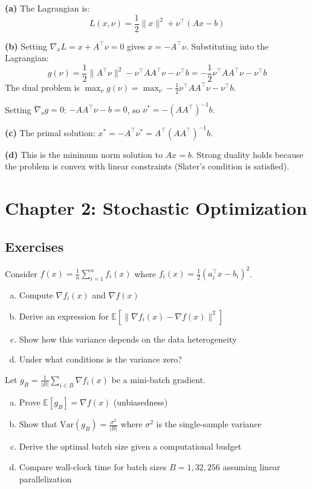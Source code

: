 \documentclass[../main.tex]{subfiles}
\begin{document}
\begin{solution}[Exercise 1.5]
\textbf{(a)} The Lagrangian is:
\[
L(x, \nu) = \frac{1}{2}\|x\|^2 + \nu^\top(Ax - b)
\]

\textbf{(b)} Setting $\nabla_x L = x + A^\top\nu = 0$ gives $x = -A^\top\nu$. Substituting into the Lagrangian:
\[
g(\nu) = \frac{1}{2}\|A^\top\nu\|^2 - \nu^\top A A^\top\nu - \nu^\top b = -\frac{1}{2}\nu^\top AA^\top\nu - \nu^\top b
\]
The dual problem is $\max_\nu g(\nu) = \max_\nu -\frac{1}{2}\nu^\top AA^\top\nu - \nu^\top b$.

Setting $\nabla_\nu g = 0$: $-AA^\top\nu - b = 0$, so $\nu^* = -(AA^\top)^{-1}b$.

\textbf{(c)} The primal solution: $x^* = -A^\top\nu^* = A^\top(AA^\top)^{-1}b$.

\textbf{(d)} This is the minimum norm solution to $Ax = b$. Strong duality holds because the problem is convex with linear constraints (Slater's condition is satisfied).
\end{solution}

\section{Chapter 2: Stochastic Optimization}\label{sec:ex-stochastic}

\subsection{Exercises}

\begin{simpleexercise}
Consider $f(x) = \frac{1}{n}\sum_{i=1}^n f_i(x)$ where $f_i(x) = \frac{1}{2}(a_i^\top x - b_i)^2$.
\begin{enumerate}[(a)]
    \item Compute $\nabla f_i(x)$ and $\nabla f(x)$
    \item Derive an expression for $\mathbb{E}[\|\nabla f_i(x) - \nabla f(x)\|^2]$
    \item Show how this variance depends on the data heterogeneity
    \item Under what conditions is the variance zero?
\end{enumerate}
\end{simpleexercise}

\begin{simpleexercise}
Let $g_B = \frac{1}{|B|}\sum_{i \in B} \nabla f_i(x)$ be a mini-batch gradient.
\begin{enumerate}[(a)]
    \item Prove $\mathbb{E}[g_B] = \nabla f(x)$ (unbiasedness)
    \item Show that $\text{Var}(g_B) = \frac{\sigma^2}{|B|}$ where $\sigma^2$ is the single-sample variance
    \item Derive the optimal batch size given a computational budget
    \item Compare wall-clock time for batch sizes $B = 1, 32, 256$ assuming linear parallelization
\end{enumerate}
\end{simpleexercise}
\end{document}
